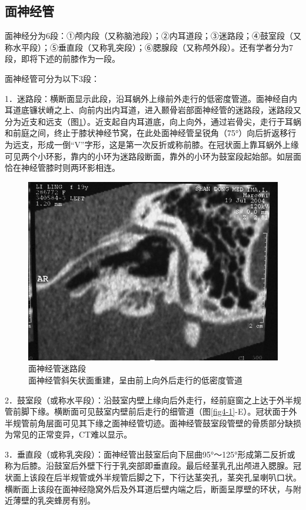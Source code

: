 \subsection{面神经管}

面神经分为6段：①颅内段（又称脑池段）；②内耳道段；③迷路段；④鼓室段（又称水平段）；⑤垂直段（又称乳突段）；⑥腮腺段（又称颅外段）。还有学者分为7段，即将下述的前膝作为一段。

面神经管可分为以下3段：

1．迷路段：横断面显示此段，沿耳蜗外上缘前外走行的低密度管道。面神经自内耳道底镰状嵴之上、向前内出内耳道，进入颞骨岩部面神经管的迷路段，迷路段又分为近支和远支（图\ref{fig4-2}）。近支起自内耳道底，向上向外，通过岩骨尖，走行于耳蜗和前庭之间，终止于膝状神经节窝，在此处面神经管呈锐角（75°）向后折返移行为远支，形成一倒“V”字形，这是第一次反折或称前膝。在冠状面上靠耳蜗外上缘可见两个小环影，靠内的小环为迷路段断面，靠外的小环为鼓室段起始部。如层面恰在神经管膝时则两环影相连。

\begin{figure}[!htbp]
 \centering
 \includegraphics[width=.7\textwidth,height=\textheight,keepaspectratio]{./images/Image00116.jpg}
 \captionsetup{justification=centering}
 \caption{面神经管迷路段\\{\small 面神经管斜矢状面重建，呈由前上向外后走行的低密度管道}}
 \label{fig4-2}
  \end{figure} 

2．鼓室段（或称水平段）：沿鼓室内壁上缘向后外走行，经前庭窗之上达于外半规管前脚下缘。横断面可见鼓室内壁前后走行的细管道（图\ref{fig4-1}-E）。冠状面于外半规管前角层面可见其下缘之面神经管切迹。面神经管鼓室段管壁的骨质部分缺损为常见的正常变异，CT难以显示。

3．垂直段（或称乳突段）：面神经管出鼓室后向下屈曲95°～125°形成第二反折或称为后膝。沿鼓室后外壁下行于乳突部即垂直段。最后经茎乳孔出颅进入腮腺。冠状面上该段在后半规管或外半规管后脚之下，下行达茎突孔，茎突孔呈喇叭口状。横断面上该段在面神经隐窝外后及外耳道后壁内端之后，断面呈厚壁的环状，与附近薄壁的乳突蜂房有别。

